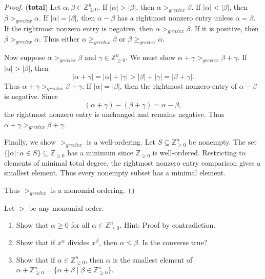 \begin{proof}
    (\textbf{total})  
    Let $\alpha, \beta \in \mathbb{Z}_{\ge 0}^n$.  
    If $|\alpha| > |\beta|$, then $\alpha >_{grevlex} \beta$.  
    If $|\alpha| < |\beta|$, then $\beta >_{grevlex} \alpha$.  
    If $|\alpha| = |\beta|$, then $\alpha - \beta$ has a rightmost nonzero entry
    unless $\alpha = \beta$.  
    If the rightmost nonzero entry is negative, then 
    $\alpha >_{grevlex} \beta$.  
    If it is positive, then $\beta >_{grevlex} \alpha$.  
    Thus either $\alpha \ge_{grevlex} \beta$ or 
    $\beta \ge_{grevlex} \alpha$.

    Now suppose $\alpha >_{grevlex} \beta$ and 
    $\gamma \in \mathbb{Z}_{\ge 0}^n$.  
    We must show $\alpha + \gamma >_{grevlex} \beta + \gamma$.
    If $|\alpha| > |\beta|$, then  
    \[
        |\alpha + \gamma| = |\alpha| + |\gamma| 
        > |\beta| + |\gamma| = |\beta + \gamma|.
    \]
    Thus $\alpha + \gamma >_{grevlex} \beta + \gamma$.
    If $|\alpha| = |\beta|$, then the rightmost nonzero entry of 
    $\alpha - \beta$ is negative.  
    Since 
    \[
        (\alpha + \gamma) - (\beta + \gamma) = \alpha - \beta,
    \]
    the rightmost nonzero entry is unchanged and remains negative.  
    Thus $\alpha + \gamma >_{grevlex} \beta + \gamma$.

    Finally, we show $>_{grevlex}$ is a well-ordering.  
    Let $S \subseteq \mathbb{Z}_{\ge 0}^n$ be nonempty.  
    The set $\{|\alpha| : \alpha \in S\} \subseteq \mathbb{Z}_{\ge 0}$ 
    has a minimum since $\mathbb{Z}_{\ge 0}$ is well-ordered.  
    Restricting to elements of minimal total degree, 
    the rightmost nonzero entry comparison gives a smallest element.  
    Thus every nonempty subset has a minimal element.

    Thus $>_{grevlex}$ is a monomial ordering.
\end{proof}


\begin{tcolorbox}[title=Problem 7, breakable]
    Let $>$ be any monomial order.
    \begin{enumerate}
        \item Show that $\alpha \ge 0$ for all $\alpha \in \mathbb{Z}_{\ge 0}^n$. Hint: Proof by contradiction.
        \item Show that if $x^\alpha$ divides $x^\beta$, then $\alpha \le \beta$. Is the converse true?
        \item Show that if $\alpha \in \mathbb{Z}_{\ge 0}^n$, then $\alpha$ is the smallest element of $\alpha + \mathbb{Z}_{\ge 0}^n = \{\alpha + \beta \mid \beta \in \mathbb{Z}_{\ge 0}^n\}$.
    \end{enumerate}
\end{tcolorbox}

